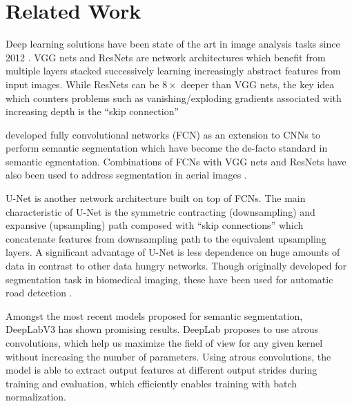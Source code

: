 \section{Related Work}
\label{sec:related}


Deep learning solutions have been state of the art in image analysis tasks
since 2012 \cite{Kri12}. VGG nets \cite{Zis14} and ResNets \cite{He15} are
network architectures which benefit from multiple layers stacked successively
learning increasingly abstract features from input images. While ResNets can be
$8\times$ deeper than VGG nets, the key idea which counters problems such as
vanishing/exploding gradients associated with increasing depth is the ``skip
connection''

\citeauthor{Lon14} \cite{Lon14} developed fully convolutional networks (FCN) as
an extension to CNNs to perform semantic segmentation which have become the
de-facto standard in semantic egmentation. Combinations of FCNs with VGG nets
and ResNets have also been used to address segmentation in aerial images
\cite{Mar16} \cite{kai17} \cite{Azi18}.

U-Net is another network architecture built on top of FCNs. The main
characteristic of U-Net is the symmetric contracting (downsampling) and
expansive (upsampling) path composed with ``skip connections'' which
concatenate features from downsampling path to the equivalent upsampling
layers. A significant advantage of U-Net is less dependence on huge amounts of
data in contrast to other data hungry networks.  Though originally developed
for segmentation task in biomedical imaging, these have been used for automatic
road detection \cite{Zha17} \cite{Guo18}.

Amongst the most recent models proposed for semantic segmentation, DeepLabV3
\cite{Che17} has shown promising results. DeepLab proposes to use atrous convolutions,
which help us maximize the field of view for any given kernel without increasing
the number of parameters. Using atrous convolutions, the model is able to extract
output features at different output strides during training and evaluation, which
efficiently enables training with batch normalization.



